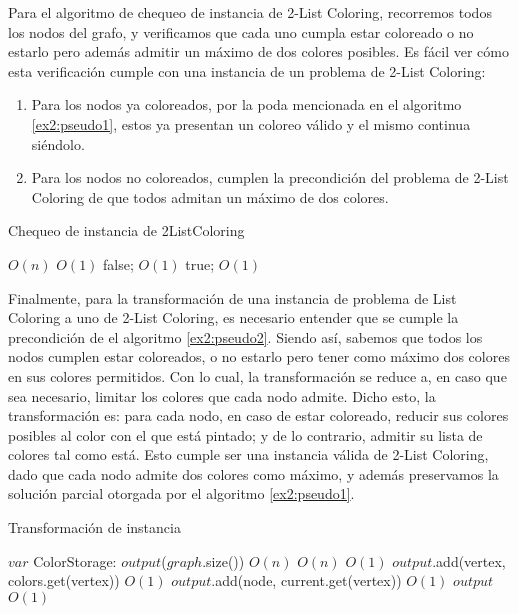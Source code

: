\documentclass{article}
\theoremstyle{definition}
\theoremstyle{remark}
\begin{document}
Para el algoritmo de chequeo de instancia de 2-List Coloring, recorremos todos los nodos del grafo, y verificamos que cada uno cumpla estar coloreado o no estarlo pero además admitir un máximo de dos colores posibles. Es fácil ver cómo esta verificación cumple con una instancia de un problema de 2-List Coloring: 
\begin{enumerate}
\item Para los nodos ya coloreados, por la poda mencionada en el algoritmo \ref{ex2:pseudo1}, estos ya presentan un coloreo válido y el mismo continua siéndolo.
\item Para los nodos no coloreados, cumplen la precondición del problema de 2-List Coloring de que todos admitan un máximo de dos colores.
\end{enumerate}


\begin{algorithm}
\caption{Chequeo de instancia de 2ListColoring}
\label{ex2:pseudo2}

\begin{algorithmic}
 \Comment $O(n)$
     \Comment $O(1)$
        \State \Return false; \Comment $O(1)$
    \EndIf
\EndFor
\State \Return true; \Comment $O(1)$
\EndFunction
\end{algorithmic}
\end{algorithm}


Finalmente, para la transformación de una instancia de problema de List Coloring a uno de 2-List Coloring, es necesario entender que se cumple la precondición de el algoritmo \ref{ex2:pseudo2}. Siendo así, sabemos que todos los nodos cumplen estar coloreados, o no estarlo pero tener como máximo dos colores en sus colores permitidos. Con lo cual, la transformación se reduce a, en caso que sea necesario, limitar los colores que cada nodo admite.
Dicho esto, la transformación es: para cada nodo, en caso de estar coloreado, reducir sus colores posibles al color con el que está pintado; y de lo contrario, admitir su lista de colores tal como está.
Esto cumple ser una instancia válida de 2-List Coloring, dado que cada nodo admite dos colores como máximo, y además preservamos la solución parcial otorgada por el algoritmo \ref{ex2:pseudo1}.


\begin{algorithm}
\caption{Transformación de instancia}
\label{ex2:pseudo3}

\begin{algorithmic}
\State $var$ ColorStorage: $output$($graph$.size()) \Comment $O(n)$
 \Comment $O(n)$
     \Comment $O(1)$
        \State $output$.add(vertex, colors.get(vertex)) \Comment $O(1)$
    \Else
        \State $output$.add(node, current.get(vertex)) \Comment $O(1)$
    \EndIf
\EndFor
\State \Return $output$ \Comment $O(1)$
\EndFunction
\end{algorithmic}
\end{algorithm}
\end{document}
